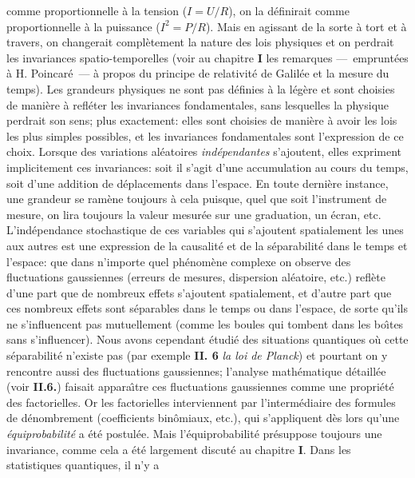 comme proportionnelle \`a la tension ($I = U/R$),  on la d\'efinirait  
comme proportionnelle \`a la puissance ($I^2 = P/R$).  Mais en agissant  
de la sorte \`a tort et \`a travers,  on changerait compl\`etement la  
nature des lois physiques et on perdrait les invariances 
spatio-temporelles (voir au chapitre {\bf I} les remarques 
---~emprunt\'ees \`a H. Poincar\'e~---  \`a propos du principe de 
relativit\'e de Galil\'ee et la mesure du temps).  Les grandeurs  
physiques ne sont pas d\'efinies \`a la l\'eg\`ere et sont choisies de 
mani\`ere \`a  refl\'eter les invariances fondamentales,  sans lesquelles  
la physique perdrait son sens;  plus exactement:  elles sont choisies de 
mani\`ere \`a avoir les lois les plus simples possibles,  et les 
invariances fondamentales sont l'expression de ce choix.  Lorsque des 
variations al\'eatoires {\it ind\'ependantes} s'ajoutent,  elles expriment 
implicitement ces invariances:  soit il s'agit d'une accumulation au cours 
du temps,  soit d'une addition de d\'eplacements dans l'espace.  En toute 
derni\`ere instance,  une grandeur se ram\`ene toujours \`a cela puisque, 
quel que soit l'instrument de mesure,  on lira toujours la valeur 
mesur\'ee sur une graduation,  un \'ecran, etc.  L'ind\'ependance 
stochastique de ces varia\-bles qui s'ajoutent spatialement les unes aux 
autres est une expression de la causalit\'e et de la s\'eparabilit\'e  
dans le temps et l'espace:  que dans n'importe quel  ph\'enom\`ene 
complexe on observe  des fluctuations gaus\-siennes (erreurs  de 
mesures, dispersion al\'eatoire, etc.) refl\`ete d'une part que de 
nombreux effets s'ajoutent spatialement,  et d'autre part que ces  
nombreux effets sont s\'eparables dans le temps ou dans l'espace, 
de sorte qu'ils ne s'influencent pas mutuellement (comme les boules  
qui tombent dans les bo{\^\i}tes sans s'influencer). 
\medskip 
Nous avons cependant \'etudi\'e des situations quantiques o\`u cette 
s\'epa\-ra\-bi\-lit\'e n'existe pas (par exemple {\bf II. 6}  
{\it la loi de Planck}) et pourtant on y rencontre aussi des fluctuations  
gaussiennes;  l'analyse math\'ematique d\'etaill\'ee (voir {\bf II.6.})  
faisait appara{\^\i}tre ces fluctuations gaussiennes comme une 
propri\'et\'e des factorielles.  Or les factorielles interviennent par 
l'inter\-m\'e\-diaire des formules de d\'enombrement (coefficients 
bin\^omiaux, etc.),  qui s'appli\-quent d\`es lors qu'une {\it 
\'equiprobabilit\'e} a \'et\'e postul\'ee.  Mais l'\'equiprobabilit\'e 
pr\'esuppose toujours une invariance,  comme cela a \'et\'e largement 
discut\'e au chapitre {\bf I}.  Dans les statistiques quantiques,  il n'y a  
